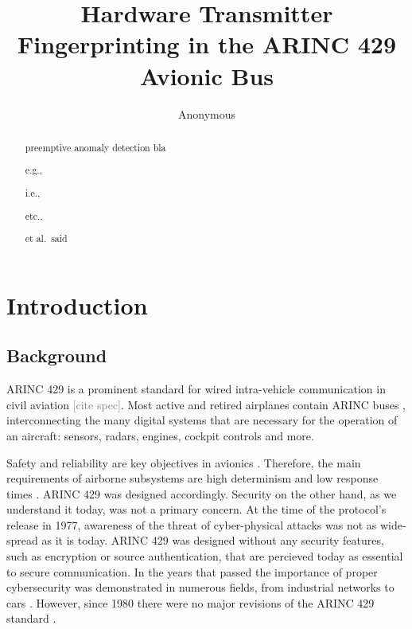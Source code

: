 \documentclass[conference]{IEEEtran}
\title{Hardware Transmitter Fingerprinting in the ARINC 429 Avionic Bus}
\author{Anonymous}
\begin{document}
\maketitle

\begin{abstract}
  preemptive anomaly detection
    bla
    
    e.g., 
    
    i.e.,
    
    etc.,
    
    et al.\ said
    
\end{abstract}


\section{Introduction}
\subsection{Background}
  
  ARINC 429 is a prominent standard for wired intra-vehicle communication in civil aviation \textcolor{gray}{[cite spec]}. Most active and retired airplanes contain ARINC buses \cite{fuchs2012evolution}, interconnecting the many digital systems that are necessary for the operation of an aircraft: sensors, radars, engines, cockpit controls and more.
  
  Safety and reliability are key objectives in avionics \cite{fuchs2012evolution}. Therefore, the main requirements of airborne subsystems are high determinism and low response times \cite{thanthry2005aviation}. ARINC 429 was designed accordingly. Security on the other hand, as we understand it today, was not a primary concern. At the time of the protocol's release in 1977, awareness of the threat of cyber-physical attacks was not as wide-spread as it is today. ARINC 429 was designed without any security features, such as encryption or source authentication, that are percieved today as essential to secure communication. In the years that passed the importance of proper cybersecurity was demonstrated in numerous fields, from industrial networks \cite{langner2011stuxnet} to cars \cite{miller2015remote}. However, since 1980 there were no major revisions of the ARINC 429 standard \cite{18937420070101}.
  
\end{document}
